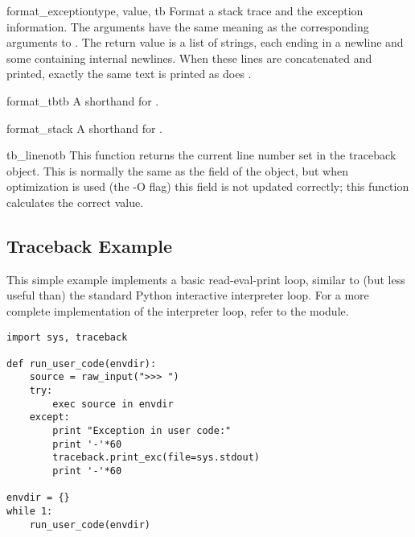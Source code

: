 \begin{funcdesc}{format_exception}{type, value, tb}
Format a stack trace and the exception information.  The arguments 
have the same meaning as the corresponding arguments to
.  The return value is a list of strings,
each ending in a newline and some containing internal newlines.  When
these lines are concatenated and printed, exactly the same text is
printed as does .
\end{funcdesc}

\begin{funcdesc}{format_tb}{tb}
A shorthand for .
\end{funcdesc}

\begin{funcdesc}{format_stack}{}
A shorthand for .
\end{funcdesc}

\begin{funcdesc}{tb_lineno}{tb}
This function returns the current line number set in the traceback
object.  This is normally the same as the 
field of the object, but when optimization is used (the -O flag) this
field is not updated correctly; this function calculates the correct
value.
\end{funcdesc}


\subsection{Traceback Example \label{traceback-example}}

This simple example implements a basic read-eval-print loop, similar
to (but less useful than) the standard Python interactive interpreter
loop.  For a more complete implementation of the interpreter loop,
refer to the  module.

\begin{verbatim}
import sys, traceback

def run_user_code(envdir):
    source = raw_input(">>> ")
    try:
        exec source in envdir
    except:
        print "Exception in user code:"
        print '-'*60
        traceback.print_exc(file=sys.stdout)
        print '-'*60

envdir = {}
while 1:
    run_user_code(envdir)
\end{verbatim}
